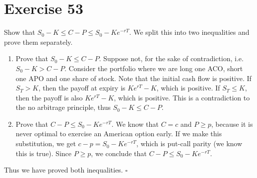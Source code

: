 \documentclass{article}
\begin{document}
\section*{Exercise 53}
\begin{flushleft}
    Show that $S_0 - K \leq C - P \leq S_0 - Ke^{-rT}$. We split this into two inequalities and prove them separately.
    \begin{enumerate}
        \item Prove that $S_0 - K \leq C - P$. Suppose not, for the sake of contradiction, i.e. $S_0 - K > C - P$. Consider the portfolio where we are long one ACO, short one APO and one share of stock.
            Note that the initial cash flow is positive. If $S_T > K$, then the payoff at expiry is $Ke^{rT} - K$, which is positive. If $S_T \leq K$, then the payoff is also $Ke^{rT} - K$, which is positive. This is a contradiction to the no arbitrage principle, thus $S_0 - K \leq C - P$.
        \item Prove that $C - P \leq S_0 - Ke^{-rT}$. We know that $C = c$ and $P \geq p$, because it is never optimal to exercise an American option early. If we make this substitution, we get $c - p = S_0 - Ke^{-rT}$, which is put-call parity (we know this is true). Since $P \geq p$, we conclude that $C - P \leq S_0 - Ke^{-rT}$.
    \end{enumerate}
    Thus we have proved both inequalities. $\square$
\end{flushleft}
\end{document}
